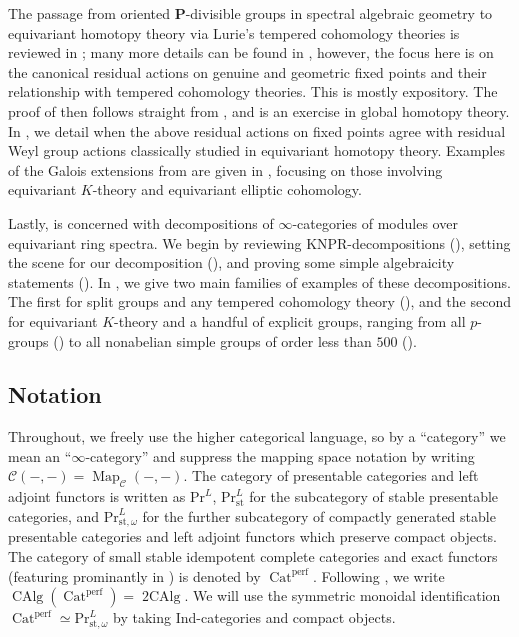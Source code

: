 \documentclass[11pt, a4paper]{article}
\newcommand{\perf}{\mathrm{perf}}
\newcommand{\st}{\mathrm{st}}
\newcommand{\1}{\mathbf{1}}
\DeclareMathOperator{\CAlg}{CAlg}
\DeclareMathOperator{\tworing}{2CAlg}
\DeclareMathOperator{\Cat}{Cat}
\newcommand{\PrL}{{\mathrm{Pr}^L}}
\newcommand{\PrLst}{{\mathrm{Pr}^L_\st}}
\newcommand{\PrLstomega}{{\mathrm{Pr}^L_{\st,\omega}}}
\DeclareMathOperator{\Map}{Map}
\newcommand{\calC}{\mathcal{C}}
\renewcommand{\P}{\mathbf{P}}
\theoremstyle{plain}
\theoremstyle{definition}
\theoremstyle{remark}\numberwithin{equation}{section}
\begin{document}
The passage from oriented $\P$-divisible groups in spectral algebraic geometry to equivariant homotopy theory via Lurie's tempered cohomology theories is reviewed in ; many more details can be found in \cite{temperedglobal}, however, the focus here is on the canonical residual actions on genuine and geometric fixed points and their relationship with tempered cohomology theories. This is mostly expository. The proof of  then follows straight from , and  is an exercise in global homotopy theory. In , we detail when the above residual actions on fixed points agree with residual Weyl group actions classically studied in equivariant homotopy theory. Examples of the Galois extensions from  are given in , focusing on those involving equivariant $K$-theory and equivariant elliptic cohomology.
    
Lastly,  is concerned with decompositions of $\infty$-categories of modules over equivariant ring spectra. We begin by reviewing KNPR-decompositions (), setting the scene for our decomposition (), and proving some simple algebraicity statements (). In , we give two main families of examples of these decompositions. The first for split groups and any tempered cohomology theory (), and the second for equivariant $K$-theory and a handful of explicit groups, ranging from all $p$-groups () to all nonabelian simple groups of order less than $500$ ().

\subsection*{Notation}
Throughout, we freely use the higher categorical language, so by a ``category'' we mean an ``$\infty$-category'' and suppress the mapping space notation by writing $\calC(-,-) = \Map_{\calC}(-,-)$. The category of presentable categories and left adjoint functors is written as $\PrL$, $\PrLst$ for the subcategory of stable presentable categories, and $\PrLstomega$ for the further subcategory of compactly generated stable presentable categories and left adjoint functors which preserve compact objects. The category of small stable idempotent complete categories and exact functors (featuring prominantly in \cite{blumgeptab}) is denoted by $\Cat^\perf$. Following \cite{mathew_Galois}, we write $\CAlg(\Cat^\perf) = \tworing$. We will use the symmetric monoidal identification $\Cat^\perf \simeq \PrLstomega$ by taking Ind-categories and compact objects.
\end{document}
